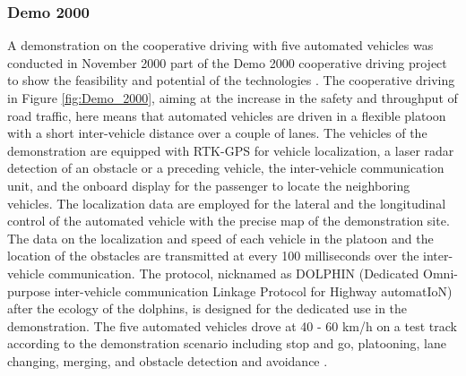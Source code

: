 \subsubsection{Demo 2000}
A demonstration on the cooperative driving with five automated vehicles was conducted in November 2000 part of the Demo 2000 cooperative driving project to show the feasibility and potential of the technologies \cite{tsugawa2000introduction}. The cooperative driving in Figure \ref{fig:Demo_2000}, aiming at the increase in the safety and throughput of road traffic, here means that automated vehicles are driven in a flexible platoon with a short inter-vehicle distance over a couple of lanes. The vehicles of the demonstration are equipped with RTK-GPS \cite{tsugawa2001cooperative} for vehicle localization, a laser radar detection of an obstacle or a preceding vehicle, the inter-vehicle communication unit, and the onboard display for the passenger to locate the neighboring vehicles. The localization data are employed for the lateral and the longitudinal control of the automated vehicle with the precise map of the demonstration site. The data on the localization and speed  of each vehicle in the platoon and the location of the obstacles are transmitted at every 100 milliseconds over the inter-vehicle communication. The protocol, nicknamed as DOLPHIN (Dedicated Omni-purpose inter-vehicle communication Linkage  Protocol for Highway automatIoN) after the ecology of the dolphins, is designed for the dedicated use in the demonstration. The five automated vehicles drove at 40 - 60 km/h on a test track according to the demonstration scenario including stop and go, platooning, lane changing, merging, and obstacle detection and avoidance \cite{tsugawa2001demo}.   


